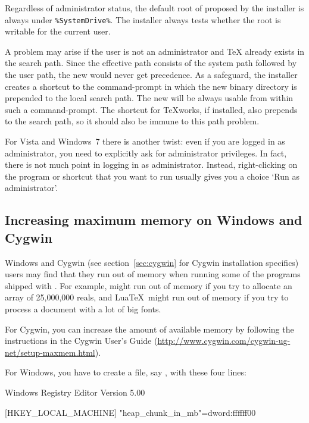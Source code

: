 \documentclass{article}
\begin{document}
Regardless of administrator status, the default root of \TL{} proposed
by the installer is always under \verb|%SystemDrive%|. The installer
always tests whether the root is writable for the current user.

A problem may arise if the user is not an administrator and \TeX{}
already exists in the search path.  Since the effective path
consists of the system path followed by the user path, the new \TL{}
would never get precedence.  As a safeguard, the installer creates a
shortcut to the command-prompt in which the new \TL{} binary
directory is prepended to the local search path.  The new \TL{} will
be always usable from within such a command-prompt. The shortcut for
\TeX{}works, if installed, also prepends \TL{} to the search path, so it
should also be immune to this path problem.

For Vista and Windows~7 there is another twist: even if you are logged in as
administrator, you need to explicitly ask for administrator
privileges. In fact, there is not much point in logging in as
administrator. Instead, right-clicking on the program or shortcut
that you want to run usually gives you a choice `Run as
administrator'.

\subsection{Increasing maximum memory on Windows and Cygwin}
\label{sec:cygwin-maxmem}

Windows and Cygwin (see section~\ref{sec:cygwin} for Cygwin installation
specifics) users may find that they run out of memory when running some
of the programs shipped with \TL.  For example,  might run out
of memory if you try to allocate an array of 25,000,000 reals, and
Lua\TeX\ might run out of memory if you try to process a document with a
lot of big fonts.

For Cygwin, you can increase the amount of available memory by following
the instructions in the Cygwin User's Guide
(\url{http://www.cygwin.com/cygwin-ug-net/setup-maxmem.html}).

For Windows, you have to create a file, say , with
these four lines:

\begin{sverbatim}
Windows Registry Editor Version 5.00

[HKEY_LOCAL_MACHINE\Software\Cygwin]
"heap_chunk_in_mb"=dword:ffffff00
\end{sverbatim}
\end{document}
